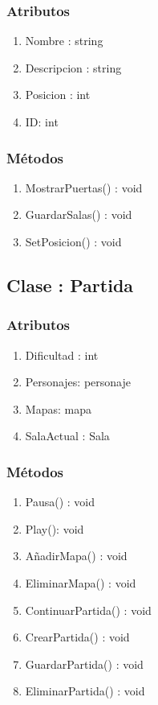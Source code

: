 \subsubsection{Atributos}
\begin{enumerate}
\item Nombre : string
\item Descripcion : string
\item Posicion : int
\item ID: int
\end{enumerate}

\subsubsection{Métodos}
\begin{enumerate}
\item MostrarPuertas() : void
\item GuardarSalas() : void
\item SetPosicion() : void
\end{enumerate}




\subsection{Clase : Partida}\label{sec:uc0}
\subsubsection{Atributos}
\begin{enumerate}
\item Dificultad : int
\item Personajes: personaje
\item Mapas: mapa
\item SalaActual : Sala
\end{enumerate}

\subsubsection{Métodos}
\begin{enumerate}
\item Pausa() : void
\item Play(): void
\item AñadirMapa() : void
\item EliminarMapa() : void
\item ContinuarPartida() : void
\item CrearPartida() : void
\item GuardarPartida() : void
\item EliminarPartida() : void
\end{enumerate}





